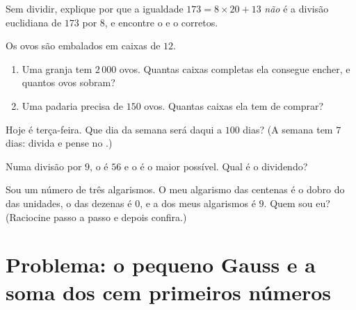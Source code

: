 \begin{exercise}[$\star$]\label{exo:g6:wholes:8}
Sem dividir, explique por que a igualdade $173 = 8 \times 20 + 13$
\emph{não} é a divisão euclidiana de $173$ por $8$, e encontre o
 e o  corretos.
\end{exercise}

\begin{exercise}[$\star\star$]\label{exo:g6:wholes:9}
Os ovos são embalados em caixas de $12$.
\begin{enumerate}
  \item Uma granja tem $2\,000$ ovos. Quantas caixas completas ela
        consegue encher, e quantos ovos sobram?
  \item Uma padaria precisa de $150$ ovos. Quantas caixas ela tem de
        comprar?
\end{enumerate}
\end{exercise}

\begin{exercise}[$\star\star$]\label{exo:g6:wholes:10}
Hoje é terça-feira. Que dia da semana será daqui a $100$ dias? (A semana
tem $7$ dias: divida e pense no .)
\end{exercise}

\begin{exercise}[$\star\star$]\label{exo:g6:wholes:11}
Numa divisão por $9$, o  é $56$ e o  é o maior possível.
Qual é o dividendo?
\end{exercise}

\begin{exercise}[$\star\star\star$]\label{exo:g6:wholes:12}
Sou um número de três algarismos. O meu algarismo das centenas é o dobro
do das unidades, o das dezenas é $0$, e a  dos meus algarismos é $9$.
Quem sou eu? (Raciocine passo a passo e depois confira.)
\end{exercise}

\section{Problema: o pequeno Gauss e a soma dos cem primeiros
números}

